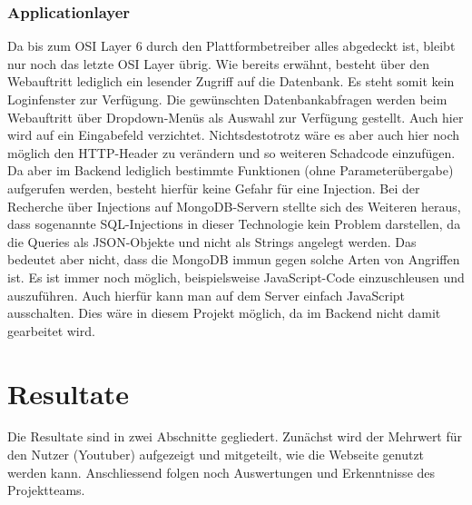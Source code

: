 \documentclass[12pt,titlepage]{article}
\begin{document}
\subsubsection{Applicationlayer}
Da bis zum OSI Layer 6 durch den Plattformbetreiber alles abgedeckt ist, bleibt nur noch das letzte OSI Layer übrig. Wie bereits erwähnt, besteht über den Webauftritt lediglich ein lesender Zugriff auf die Datenbank. Es steht somit kein Loginfenster zur Verfügung. Die gewünschten Datenbankabfragen werden beim Webauftritt über Dropdown-Menüs als Auswahl zur Verfügung gestellt. Auch hier wird auf ein Eingabefeld verzichtet. Nichtsdestotrotz wäre es aber auch hier noch möglich den HTTP-Header zu verändern und so weiteren Schadcode einzufügen. Da aber im Backend lediglich bestimmte Funktionen (ohne Parameterübergabe) aufgerufen werden, besteht hierfür keine Gefahr für eine Injection. Bei der Recherche über Injections auf MongoDB-Servern stellte sich des Weiteren heraus, dass sogenannte SQL-Injections in dieser Technologie kein Problem darstellen, da die Queries als JSON-Objekte und nicht als Strings angelegt werden. Das bedeutet aber nicht, dass die MongoDB immun gegen solche Arten von Angriffen ist. Es ist immer noch möglich, beispielsweise JavaScript-Code einzuschleusen und auszuführen. Auch hierfür kann man auf dem Server einfach JavaScript ausschalten. Dies wäre in diesem Projekt möglich, da im Backend nicht damit gearbeitet wird.
\newpage



\section{Resultate}\label{Resultate}
Die Resultate sind in zwei Abschnitte gegliedert. Zunächst wird der Mehrwert für den Nutzer (Youtuber) aufgezeigt und mitgeteilt, wie die Webseite genutzt werden kann. Anschliessend folgen noch Auswertungen und Erkenntnisse des Projektteams.
\end{document}
